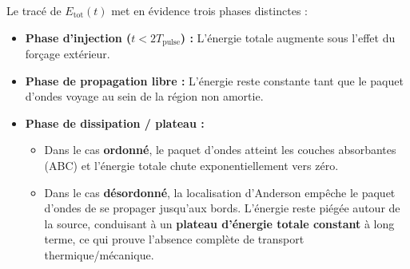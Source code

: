 \documentclass[11pt, a4paper]{report}
\begin{document}
Le tracé de $E_{\text{tot}}(t)$ met en évidence trois phases distinctes :
\begin{itemize}
    \item \textbf{Phase d'injection ($t < 2T_{\text{pulse}}$) :} L'énergie totale augmente sous l'effet du forçage extérieur.
    \item \textbf{Phase de propagation libre :} L'énergie reste constante tant que le paquet d'ondes voyage au sein de la région non amortie.
    \item \textbf{Phase de dissipation / plateau :}
    \begin{itemize}
        \item Dans le cas \textbf{ordonné}, le paquet d'ondes atteint les couches absorbantes (ABC) et l'énergie totale chute exponentiellement vers zéro.
        \item Dans le cas \textbf{désordonné}, la localisation d'Anderson empêche le paquet d'ondes de se propager jusqu'aux bords. L'énergie reste piégée autour de la source, conduisant à un \textbf{plateau d'énergie totale constant} à long terme, ce qui prouve l'absence complète de transport thermique/mécanique.
    \end{itemize}
\end{itemize}
\end{document}
